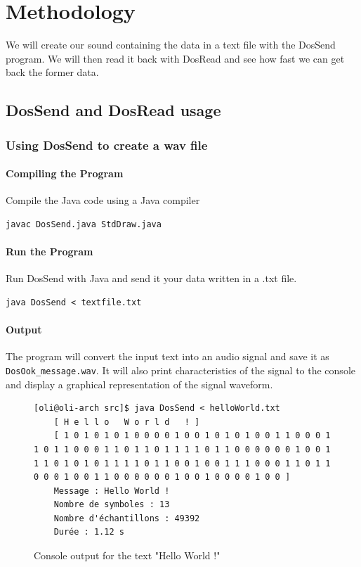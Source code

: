 \chapter{Methodology}

We will create our sound containing the data in a text file with the DosSend program. We will then read it back with DosRead and see how fast we can get back the former data.

\section{DosSend and DosRead usage}

\subsection{Using DosSend to create a wav file}

\subsubsection{Compiling the Program}

Compile the Java code using a Java compiler

\begin{lstlisting}
javac DosSend.java StdDraw.java
\end{lstlisting}

\subsubsection{Run the Program}

Run DosSend with Java and send it your data written in a .txt file.

\begin{lstlisting}
java DosSend < textfile.txt
\end{lstlisting}

\subsubsection{Output}

The program will convert the input text into an audio signal and save it as \texttt{DosOok\_message.wav}. It will also print characteristics of the signal to the console and display a graphical representation of the signal waveform.

\begin{figure}[!h]
	\begin{lstlisting}[style=console]
	[oli@oli-arch src]$ java DosSend < helloWorld.txt
	[ H e l l o   W o r l d   ! ]
	[ 1 0 1 0 1 0 1 0 0 0 0 1 0 0 1 0 1 0 1 0 0 1 1 0 0 0 1 1 0 1 1 0 0 0 1 1 0 1 1 0 1 1 1 1 0 1 1 0 0 0 0 0 0 1 0 0 1 1 1 0 1 0 1 0 1 1 1 1 0 1 1 0 0 1 0 0 1 1 1 0 0 0 1 1 0 1 1 0 0 0 1 0 0 1 1 0 0 0 0 0 0 1 0 0 1 0 0 0 0 1 0 0 ]
	Message : Hello World !
	Nombre de symboles : 13
	Nombre d'échantillons : 49392
	Durée : 1.12 s
	\end{lstlisting}
	\caption{Console output for the text "Hello World !"}
\end{figure}

